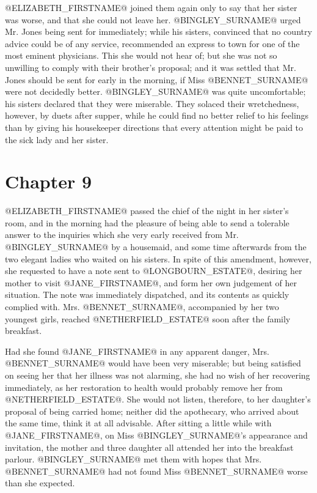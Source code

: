 @ELIZABETH_FIRSTNAME@ joined them again only to say that her sister was worse, and
that she could not leave her. @BINGLEY_SURNAME@ urged Mr. Jones being sent for
immediately; while his sisters, convinced that no country advice could
be of any service, recommended an express to town for one of the most
eminent physicians. This she would not hear of; but she was not so
unwilling to comply with their brother's proposal; and it was settled
that Mr. Jones should be sent for early in the morning, if Miss @BENNET_SURNAME@
were not decidedly better. @BINGLEY_SURNAME@ was quite uncomfortable; his sisters
declared that they were miserable. They solaced their wretchedness,
however, by duets after supper, while he could find no better relief
to his feelings than by giving his housekeeper directions that every
attention might be paid to the sick lady and her sister.



\chapter*{Chapter 9}


@ELIZABETH_FIRSTNAME@ passed the chief of the night in her sister's room, and in the
morning had the pleasure of being able to send a tolerable answer to the
inquiries which she very early received from Mr. @BINGLEY_SURNAME@ by a housemaid,
and some time afterwards from the two elegant ladies who waited on his
sisters. In spite of this amendment, however, she requested to have a
note sent to @LONGBOURN_ESTATE@, desiring her mother to visit @JANE_FIRSTNAME@, and form her
own judgement of her situation. The note was immediately dispatched, and
its contents as quickly complied with. Mrs. @BENNET_SURNAME@, accompanied by her
two youngest girls, reached @NETHERFIELD_ESTATE@ soon after the family breakfast.

Had she found @JANE_FIRSTNAME@ in any apparent danger, Mrs. @BENNET_SURNAME@ would have been
very miserable; but being satisfied on seeing her that her illness was
not alarming, she had no wish of her recovering immediately, as her
restoration to health would probably remove her from @NETHERFIELD_ESTATE@. She
would not listen, therefore, to her daughter's proposal of being carried
home; neither did the apothecary, who arrived about the same time, think
it at all advisable. After sitting a little while with @JANE_FIRSTNAME@, on Miss
@BINGLEY_SURNAME@'s appearance and invitation, the mother and three daughter all
attended her into the breakfast parlour. @BINGLEY_SURNAME@ met them with hopes
that Mrs. @BENNET_SURNAME@ had not found Miss @BENNET_SURNAME@ worse than she expected.

